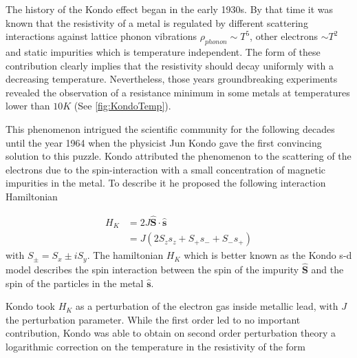 The history of the Kondo effect began in the early 1930s. By that time it was known that the resistivity of a metal is regulated by different scattering interactions against lattice phonon vibrations $\rho_{phonon} \sim T^5$, other electrons $\sim T^2$ and static impurities which is temperature independent. The form of these contribution clearly implies that the resistivity should decay uniformly with a decreasing temperature. Nevertheless, those years groundbreaking experiments revealed the observation of a resistance minimum in some metals at temperatures lower than $10K$ (See \ref{fig:KondoTemp}). 

This phenomenon intrigued the scientific community for the following decades until the year 1964 when the physicist  Jun Kondo gave the first convincing solution to this puzzle. Kondo attributed the phenomenon to the scattering of the electrons due to the spin-interaction with a small concentration of magnetic impurities in the metal. To describe it he proposed the following interaction Hamiltonian


\begin{align}
H_K &= 2J\hat{\textbf{S}}\cdot \hat{\textbf{s}} \\
&=  J (2S_z s_z + S_+s_- +S_-s_+)
\end{align}
with $S_\pm = S_x \pm iS_y$. The hamiltonian $H_K$ which is better known as the Kondo s-d model describes the spin interaction between the spin of the impurity $\hat{\textbf{S}}$ and the spin of the particles in the metal $\hat{\textbf{s}}$.


Kondo took $H_K$ as a perturbation of the electron gas inside metallic lead, with $J$ the perturbation parameter. While the first order led to no important contribution, Kondo was able to obtain on second order perturbation theory a logarithmic correction on the temperature in the resistivity of the form 

